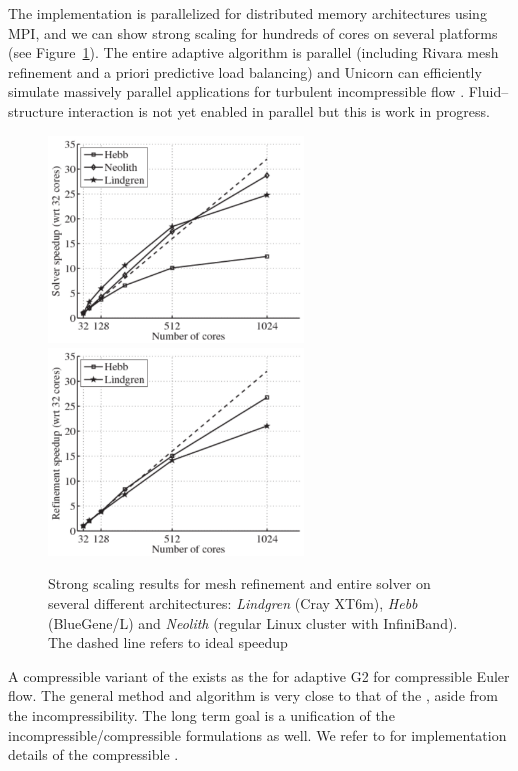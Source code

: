 The  implementation is parallelized for distributed memory
architectures using MPI, and we can show strong scaling for hundreds
of cores on several platforms (see Figure~\ref{fig:hoffman-2:sp}). The
entire adaptive algorithm is parallel (including Rivara mesh refinement
and a priori predictive load balancing) and Unicorn can efficiently
simulate massively parallel applications for turbulent incompressible
flow \citep{JanssonHoffmanJansson2010, Jansson2011}. Fluid--structure
interaction is not yet enabled in parallel but this is work in progress.

\begin{figure}
\centering
\includegraphics[height=5.5cm]{chapters/hoffman-2/pdf/speedup_solve.pdf}
\includegraphics[height=5.5cm]{chapters/hoffman-2/pdf/speedup_unrivara.pdf}
\caption{\label{fig:hoffman-2:sp} Strong scaling results for mesh
refinement and entire solver on several different architectures:
\textit{Lindgren} (Cray XT6m), \textit{Hebb} (BlueGene/L) and
\textit{Neolith} (regular Linux cluster with InfiniBand). The dashed
line refers to ideal speedup}
\end{figure}


A compressible variant of the  exists as the 
for adaptive G2 for compressible Euler flow. The general method
and algorithm is very close to that of the , aside
from the incompressibility. The long term goal is a unification of
the incompressible/compressible formulations as well. We refer to
\citet{Nazarov2009} for implementation details of the compressible
.

